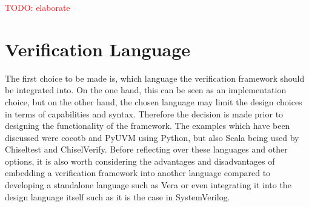 \documentclass[11pt,a4paper]{report}
\newcommand{\todo}[1]{\textcolor{red}{TODO: #1}}
\begin{document}
\todo{elaborate}

\section{Verification Language} %

The first choice to be made is, which language the verification framework should be integrated into. On the one hand,
this can be seen as an implementation choice, but on the other hand, the chosen language may limit the design choices
in terms of capabilities and syntax. Therefore the decision is made prior to designing the functionality of the
framework. The examples
which have been discussed were cocotb and PyUVM using Python, but also Scala being used by Chiseltest and
ChiselVerify. Before reflecting over these languages and other options, it is also worth considering the advantages
and disadvantages of embedding a verification framework into another language compared to developing a standalone
language such as Vera or even integrating it into the design language itself such as it is the case in SystemVerilog.
\end{document}
